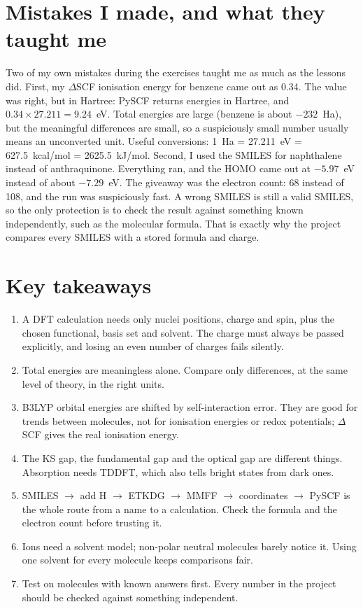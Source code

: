 \documentclass[11pt,a4paper]{article}
\begin{document}
\section{Mistakes I made, and what they taught me}

Two of my own mistakes during the exercises taught me as much as the lessons did. First, my
$\Delta$SCF ionisation energy for benzene came out as 0.34. The value was right, but in Hartree:
PySCF returns energies in Hartree, and $0.34 \times 27.211 = 9.24$~eV. Total energies are large
(benzene is about $-232$~Ha), but the meaningful differences are small, so a suspiciously small
number usually means an unconverted unit. Useful conversions: 1~Ha = 27.211~eV = 627.5~kcal/mol =
2625.5~kJ/mol. Second, I used the SMILES for naphthalene instead of anthraquinone. Everything ran,
and the HOMO came out at $-5.97$~eV instead of about $-7.29$~eV. The giveaway was the electron
count: 68 instead of 108, and the run was suspiciously fast. A wrong SMILES is still a valid
SMILES, so the only protection is to check the result against something known independently, such
as the molecular formula. That is exactly why the project compares every SMILES with a stored
formula and charge.

\section{Key takeaways}

\begin{takeaway}
\begin{enumerate}[leftmargin=*]
  \item A DFT calculation needs only nuclei positions, charge and spin, plus the chosen
  functional, basis set and solvent. The charge must always be passed explicitly, and losing an
  even number of charges fails silently.
  \item Total energies are meaningless alone. Compare only differences, at the same level of
  theory, in the right units.
  \item B3LYP orbital energies are shifted by self-interaction error. They are good for trends
  between molecules, not for ionisation energies or redox potentials; $\Delta$SCF gives the real
  ionisation energy.
  \item The KS gap, the fundamental gap and the optical gap are different things. Absorption needs
  TDDFT, which also tells bright states from dark ones.
  \item SMILES $\to$ add H $\to$ ETKDG $\to$ MMFF $\to$ coordinates $\to$ PySCF is the whole route
  from a name to a calculation. Check the formula and the electron count before trusting it.
  \item Ions need a solvent model; non-polar neutral molecules barely notice it. Using one solvent
  for every molecule keeps comparisons fair.
  \item Test on molecules with known answers first. Every number in the project should be
  checked against something independent.
\end{enumerate}
\end{takeaway}
\end{document}
